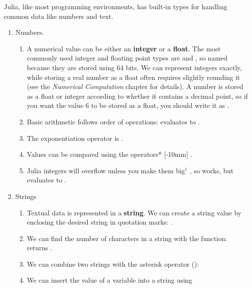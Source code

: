 \documentclass[prettycode,jlmin,shellescape]{watsonbook}
\begin{document}
Julia, like most programming environments, has built-in types for
handling common data like numbers and text.

\begin{enumerate}
\item Numbers.
  \begin{enumerate}
  \item A numerical value can be either an \textbf{integer} or a
    \textbf{float}. The most commonly used integer and floating point
    types are  and , so named
    because they are stored using 64 bits. We can represent integers
    exactly, while storing a real number as a float often requires
    slightly rounding it (see the \textit{Numerical
      Computation} chapter for details). A number is stored as a float or
    integer according to whether it contains a decimal point, so if
    you want the value 6 to be stored as a float, you should write it
    as .
  \item Basic arithmetic follows order of operations: 
     evaluates to . 
  \item The exponentiation operator is \jlverb{^}. 
  \item Values can be compared using the operators* [-10mm]
    .
  \item Julia integers will overflow unless you make them big${}^\dagger$
    , so
     works, but 
    evaluates to . 
  \end{enumerate}
\item Strings
  \begin{enumerate}
  \item Textual data is represented in a \textbf{string}. We can
    create a string value by enclosing the desired string in quotation
    marks: . 
  \item We can find the number of characters in a string with the
     function: 
    returns . 
  \item We can combine two strings with the asterisk operator (\jlverb{*}):
  \item We can insert the value of a variable into a string using

\end{enumerate}
\end{enumerate}
\end{document}
